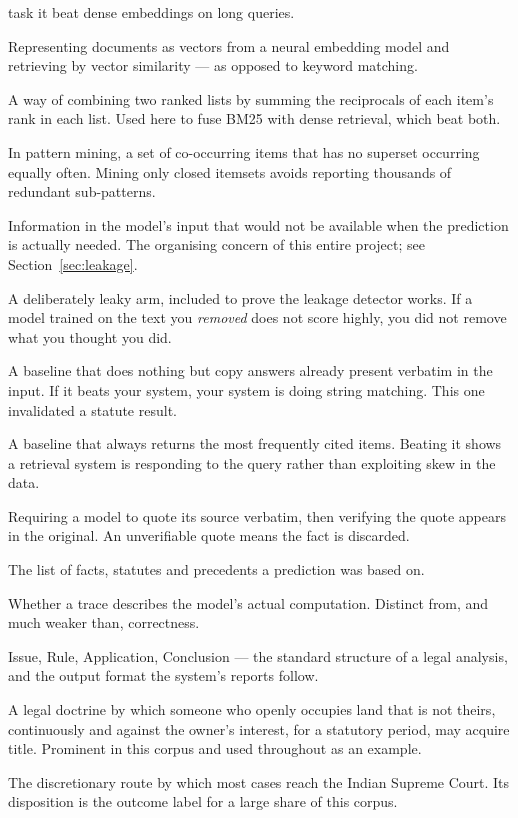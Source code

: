 \documentclass[12pt,a4paper]{article}
\begin{document}
\begin{description}[leftmargin=0pt,style=nextline,itemsep=3pt]
task it beat dense embeddings on long queries.
\item[Dense retrieval] Representing documents as vectors from a neural embedding model and retrieving
by vector similarity --- as opposed to keyword matching.
\item[RRF (reciprocal rank fusion)] A way of combining two ranked lists by summing the reciprocals of
each item's rank in each list. Used here to fuse BM25 with dense retrieval, which beat both.
\item[Closed itemset] In pattern mining, a set of co-occurring items that has no superset occurring
equally often. Mining only closed itemsets avoids reporting thousands of redundant sub-patterns.
\item[Leakage] Information in the model's input that would not be available when the prediction is
actually needed. The organising concern of this entire project; see Section~\ref{sec:leakage}.
\item[Sensitivity control] A deliberately leaky arm, included to prove the leakage detector works. If
a model trained on the text you \emph{removed} does not score highly, you did not remove what you
thought you did.
\item[Copy control] A baseline that does nothing but copy answers already present verbatim in the
input. If it beats your system, your system is doing string matching. This one invalidated a statute
result.
\item[Popularity control] A baseline that always returns the most frequently cited items. Beating it
shows a retrieval system is responding to the query rather than exploiting skew in the data.
\item[Grounding] Requiring a model to quote its source verbatim, then verifying the quote appears in
the original. An unverifiable quote means the fact is discarded.
\item[Trace] The list of facts, statutes and precedents a prediction was based on.
\item[Faithfulness] Whether a trace describes the model's actual computation. Distinct from, and much
weaker than, correctness.
\item[IRAC] Issue, Rule, Application, Conclusion --- the standard structure of a legal analysis, and
the output format the system's reports follow.
\item[Adverse possession] A legal doctrine by which someone who openly occupies land that is not
theirs, continuously and against the owner's interest, for a statutory period, may acquire title.
Prominent in this corpus and used throughout as an example.
\item[SLP (special leave petition)] The discretionary route by which most cases reach the Indian
Supreme Court. Its disposition is the outcome label for a large share of this corpus.
\end{description}
\end{document}
